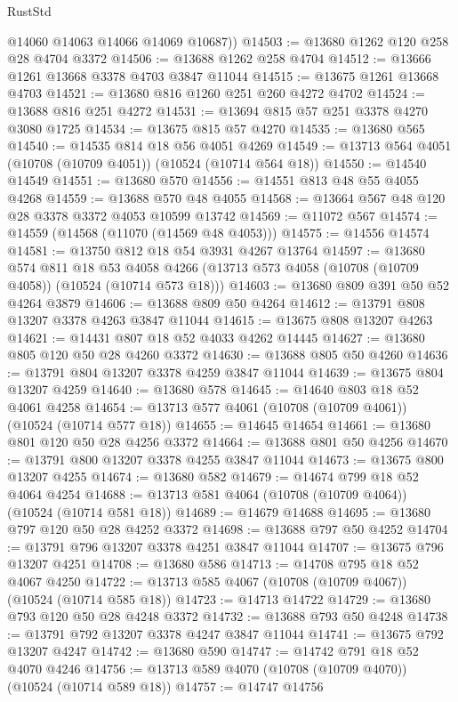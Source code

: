 \begin{lexlean}{RustStd}
\begin{coremodule}
        @14060
        @14063
        @14066
        @14069
        @10687))
@14503 := @13680 @1262 @120 @258 @28 @4704 @3372
@14506 := @13688 @1262 @258 @4704
@14512 := @13666 @1261 @13668 @3378 @4703 @3847 @11044
@14515 := @13675 @1261 @13668 @4703
@14521 := @13680 @816 @1260 @251 @260 @4272 @4702
@14524 := @13688 @816 @251 @4272
@14531 := @13694 @815 @57 @251 @3378 @4270 @3080 @1725
@14534 := @13675 @815 @57 @4270
@14535 := @13680 @565
@14540 := @14535 @814 @18 @56 @4051 @4269
@14549 := @13713 @564 @4051 (@10708 (@10709 @4051)) (@10524 (@10714 @564 @18))
@14550 := @14540 @14549
@14551 := @13680 @570
@14556 := @14551 @813 @48 @55 @4055 @4268
@14559 := @13688 @570 @48 @4055
@14568 := @13664 @567 @48 @120 @28 @3378 @3372 @4053 @10599 @13742
@14569 := @11072 @567
@14574 := @14559 (@14568 (@11070 (@14569 @48 @4053)))
@14575 := @14556 @14574
@14581 := @13750 @812 @18 @54 @3931 @4267 @13764
@14597 := @13680
    @574
    @811
    @18
    @53
    @4058
    @4266
    (@13713 @573 @4058 (@10708 (@10709 @4058)) (@10524 (@10714 @573 @18)))
@14603 := @13680 @809 @391 @50 @52 @4264 @3879
@14606 := @13688 @809 @50 @4264
@14612 := @13791 @808 @13207 @3378 @4263 @3847 @11044
@14615 := @13675 @808 @13207 @4263
@14621 := @14431 @807 @18 @52 @4033 @4262 @14445
@14627 := @13680 @805 @120 @50 @28 @4260 @3372
@14630 := @13688 @805 @50 @4260
@14636 := @13791 @804 @13207 @3378 @4259 @3847 @11044
@14639 := @13675 @804 @13207 @4259
@14640 := @13680 @578
@14645 := @14640 @803 @18 @52 @4061 @4258
@14654 := @13713 @577 @4061 (@10708 (@10709 @4061)) (@10524 (@10714 @577 @18))
@14655 := @14645 @14654
@14661 := @13680 @801 @120 @50 @28 @4256 @3372
@14664 := @13688 @801 @50 @4256
@14670 := @13791 @800 @13207 @3378 @4255 @3847 @11044
@14673 := @13675 @800 @13207 @4255
@14674 := @13680 @582
@14679 := @14674 @799 @18 @52 @4064 @4254
@14688 := @13713 @581 @4064 (@10708 (@10709 @4064)) (@10524 (@10714 @581 @18))
@14689 := @14679 @14688
@14695 := @13680 @797 @120 @50 @28 @4252 @3372
@14698 := @13688 @797 @50 @4252
@14704 := @13791 @796 @13207 @3378 @4251 @3847 @11044
@14707 := @13675 @796 @13207 @4251
@14708 := @13680 @586
@14713 := @14708 @795 @18 @52 @4067 @4250
@14722 := @13713 @585 @4067 (@10708 (@10709 @4067)) (@10524 (@10714 @585 @18))
@14723 := @14713 @14722
@14729 := @13680 @793 @120 @50 @28 @4248 @3372
@14732 := @13688 @793 @50 @4248
@14738 := @13791 @792 @13207 @3378 @4247 @3847 @11044
@14741 := @13675 @792 @13207 @4247
@14742 := @13680 @590
@14747 := @14742 @791 @18 @52 @4070 @4246
@14756 := @13713 @589 @4070 (@10708 (@10709 @4070)) (@10524 (@10714 @589 @18))
@14757 := @14747 @14756

\end{coremodule}
\end{lexlean}
